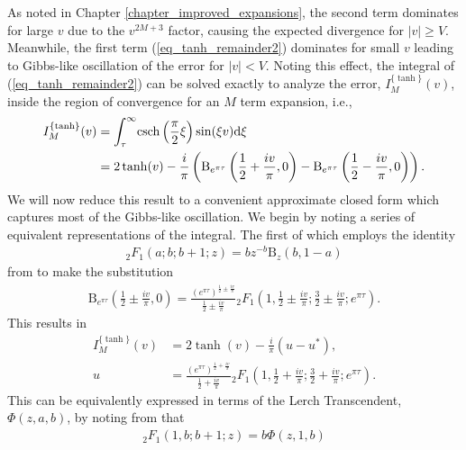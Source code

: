 As noted in Chapter \ref{chapter_improved_expansions}, the second term dominates
for large $v$ due to the $v^{2M+3}$ factor, causing the expected divergence
for $|v| \geq V$.  Meanwhile, the first term (\ref{eq_tanh_remainder2})
dominates for small $v$ leading to Gibbs-like oscillation of the
error for $|v| < V$.  Noting this effect, the integral of
(\ref{eq_tanh_remainder2}) can be solved exactly to analyze the
error, $I_M^{\{\tanh\}}(v)$, inside the region of convergence for
an $M$ term expansion, i.e.,
\begin{gather}
	\begin{split}
		I_M^{\{\tanh\}}(v) &= \int_\tau^{\infty} \!
		\operatorname{csch}\left(\frac{\pi}{2}\xi\right)
		\sin(\xi v) \mathrm{d}\xi \\
		&= 2 \tanh(v) - \frac{i}{\pi}\left(
		\mathrm{B}_{e^{\pi \tau}}\left(\frac{1}{2} + \frac{iv}{\pi}, 0 \right)
		- \mathrm{B}_{e^{\pi \tau}}\left(\frac{1}{2} - \frac{iv}{\pi}, 0 \right)\right). \\
	\end{split}
\end{gather}
We will now reduce this result to a convenient approximate closed form which
captures most of the Gibbs-like oscillation.  We begin by noting a series of
equivalent representations of the integral.  The first of which employs the
identity
\begin{align}
	{}_{2}F_{1}\left(a; b; b+1; z\right) = bz^{-b}\mathrm{B}_z(b, 1-a)
\end{align}
from \cite{prudnikov_integrals_2003}
to make the substitution
\begin{align}
	\mathrm{B}_{e^{\pi\tau}}\left(\frac{1}{2} \pm \frac{iv}{\pi}, 0\right)
	= \frac{(e^{\pi\tau})^{\frac{1}{2} \pm \frac{iv}{\pi}}}{\frac{1}{2} \pm \frac{iv}{\pi}}
	{}_{2}F_{1}\left(1, \frac{1}{2} \pm \frac{iv}{\pi}; \frac{3}{2} \pm \frac{iv}{\pi}; e^{\pi \tau}\right).
\end{align}
This results in
\begin{align}
	I_M^{\{\tanh\}}(v) &= 2 \tanh(v) - \frac{i}{\pi}\left(u - u^*\right), \\
	u &= \frac{(e^{\pi\tau})^{\frac{1}{2} + \frac{iv}{\pi}}}{\frac{1}{2} + \frac{iv}{\pi}}
	    {}_{2}F_{1}\left(1, \frac{1}{2} + \frac{iv}{\pi}; \frac{3}{2} + \frac{iv}{\pi}; e^{\pi \tau}\right).
\end{align}
This can be equivalently expressed in terms of the Lerch Transcendent, $\Phi(z, a, b)$, by noting
from \cite{prudnikov_integrals_2003} that
\begin{align}
	{}_{2}F_{1}\left(1, b; b+1; z\right) = b \Phi(z, 1, b)
\end{align}
